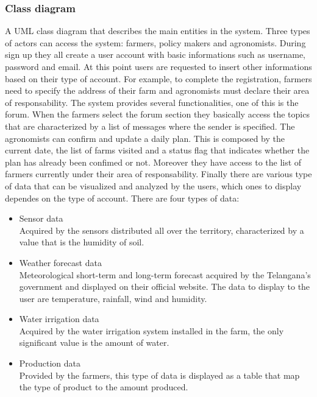 \documentclass[table, 12pt]{article}
\begin{document}
\subsubsection{Class diagram}
A UML class diagram that describes the main entities in the system.
Three types of actors can access the system: farmers, policy makers and agronomists.
During sign up they all create a user account with basic informations such as username, password and email.
At this point users are requested to insert other informations based on their type of account.
For example, to complete the registration, farmers need to specify the address of their farm and agronomists must declare their area of responsability.
The system provides several functionalities, one of this is the forum.
When the farmers select the forum section they basically access the topics that are characterized by a list of messages where the sender is specified. 
The agronomists can confirm and update a daily plan.
This is composed by the current date, the list of farms visited and a status flag that indicates whether the plan has already been confimed or not.
Moreover they have access to the list of farmers currently under their area of responsability.
Finally there are various type of data that can be visualized and analyzed by the users, which ones to display dependes on the type of account.
There are four types of data:
\begin{itemize}
    \item Sensor data\\
    Acquired by the sensors distributed all over the territory, characterized by a value that is the humidity of soil.
    \item Weather forecast data\\
    Meteorological short-term and long-term forecast acquired by the Telangana's government and displayed on their official website.
    The data to display to the user are temperature, rainfall, wind and humidity.
    \item Water irrigation data\\
    Acquired by the water irrigation system installed in the farm, the only significant value is the amount of water.
    \item Production data\\
    Provided by the farmers, this type of data is displayed as a table that map the type of product to the amount produced.
\end{itemize}
\end{document}
